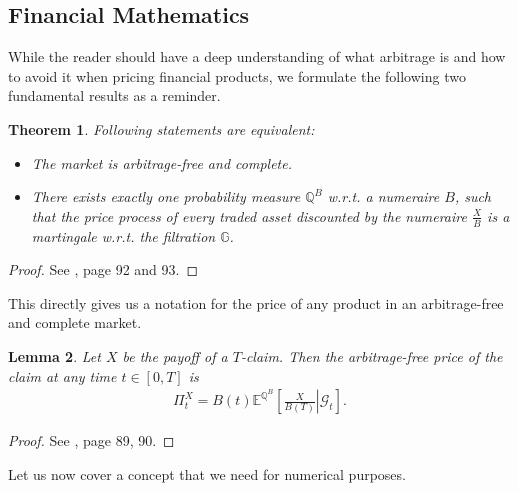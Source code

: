 \documentclass[12pt]{article}
\newtheorem{theorem}{Theorem}[section]
\newtheorem{lemma}[theorem]{Lemma}
\begin{document}
	\subsection{Financial Mathematics}
	While the reader should have a deep understanding of what arbitrage is and how to avoid it when pricing financial products, we formulate the following two fundamental results as a reminder.
	\begin{theorem}
		Following statements are equivalent:
		\begin{itemize}
			\item The market is arbitrage-free and complete.
			\item There exists exactly one probability measure $\mathbb{Q}^B$ w.r.t. a numeraire $B$, such that the price process of every traded asset discounted by the numeraire $\frac{X}{B}$ is a martingale w.r.t. the filtration $\mathbb{G}$.
		\end{itemize}
	\end{theorem}
	\begin{proof}
		See \cite{fima2Lecture}, page 92 and 93. %
	\end{proof}
	This directly gives us a notation for the price of any product in an arbitrage-free and complete market.
	\begin{lemma}
		Let $X$ be the payoff of a $T$-claim. Then the arbitrage-free price of the claim at any time $t\in \left[0, T\right]$ is
		\begin{align*}
			\Pi^X_t = B(t)\mathbb{E}^{\mathbb{Q}^B}\left[\left.\frac{X}{B(T)} \right| \mathcal{G}_t\right].
		\end{align*}
	\end{lemma}
	\begin{proof}
		See \cite{fima2Lecture}, page 89, 90. %
	\end{proof}
	Let us now cover a concept that we need for numerical purposes.
	
	
\end{document}
